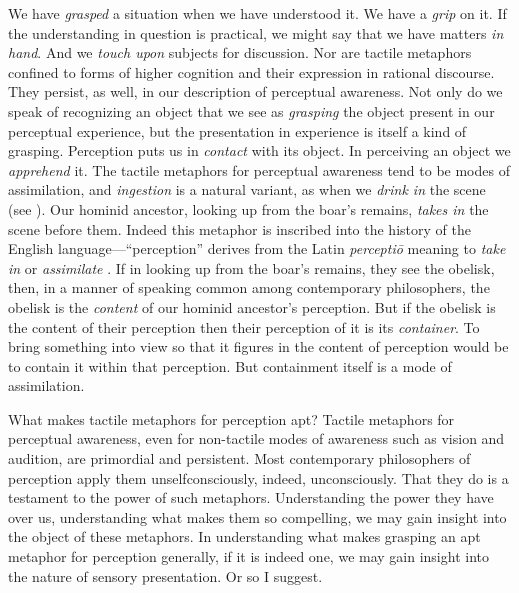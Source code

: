 We have \emph{grasped} a situation when we have understood it. We have a \emph{grip} on it. If the understanding in question is practical, we might say that we have matters \emph{in hand}. And we \emph{touch upon} subjects for discussion. Nor are tactile metaphors confined to forms of higher cognition and their expression in rational discourse. They persist, as well, in our description of perceptual awareness. Not only do we speak of recognizing an object that we see as \emph{grasping} the object present in our perceptual experience, but the presentation in experience is itself a kind of grasping. Perception puts us in \emph{contact} with its object. In perceiving an object we \emph{apprehend} it. The tactile metaphors for perceptual awareness tend to be modes of assimilation, and \emph{ingestion} is a natural variant, as when we \emph{drink in} the scene (see \citealt{Johnston:2006uq,Price:1932fk}). Our hominid ancestor, looking up from the boar's remains, \emph{takes in} the scene before them. Indeed this metaphor is inscribed into the history of the English language---``perception'' derives from the Latin \emph{perceptiō} meaning to \emph{take in} or \emph{assimilate} \citep[102]{Burnyeat:1979mv}. If in looking up from the boar's remains, they see the obelisk, then, in a manner of speaking common among contemporary philosophers, the obelisk is the \emph{content} of our hominid ancestor's perception. But if the obelisk is the content of their perception then their perception of it is its \emph{container}. To bring something into view so that it figures in the content of perception would be to contain it within that perception. But containment itself is a mode of assimilation. 

What makes tactile metaphors for perception apt? Tactile metaphors for perceptual awareness, even for non-tactile modes of awareness such as vision and audition, are primordial and persistent. Most contemporary philosophers of perception apply them unselfconsciously, indeed, unconsciously. That they do is a testament to the power of such metaphors. Understanding the power they have over us, understanding what makes them so compelling, we may gain insight into the object of these metaphors. In understanding what makes grasping an apt metaphor for perception generally, if it is indeed one, we may gain insight into the nature of sensory presentation. Or so I suggest.


